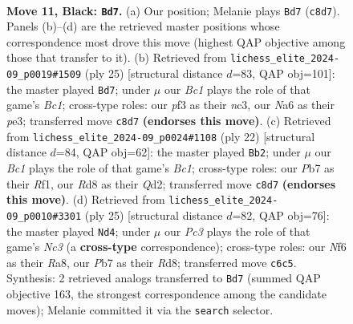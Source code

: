 \documentclass[11pt]{article}
\begin{document}
\begin{figure}[p]
\label{fig:thought-m19}
\end{figure}

\clearpage

\begin{figure}[p]\centering
\begin{subfigure}{0.46\textwidth}\centering
\resizebox{\linewidth}{!}{%
\newchessgame
\chessboard[
  setfen={r1br2k1/ppq1bppp/n1p1pn2/8/P1NP4/1P3PP1/4P1BP/RNBQ1RK1 b - - 0 11},
  showmover=false,
  pgfstyle=straightmove, color=movearrow, markmove={c8-d7}
]}
\caption{}
\end{subfigure}\hfill
\begin{subfigure}{0.46\textwidth}\centering
\resizebox{\linewidth}{!}{%
\newchessgame
\chessboard[
  setfen={r1br2k1/ppq1bppp/2p1pn2/8/2NP4/2N1P1P1/PP3PBP/2RQ1RK1 b - - 4 13},
  showmover=false,
  pgfstyle=straightmove, color=movearrow, markmove={c8-d7}
]}
\caption{}
\end{subfigure}
\\[4pt]
\begin{subfigure}{0.46\textwidth}\centering
\resizebox{\linewidth}{!}{%
\newchessgame
\chessboard[
  setfen={1rbq1rk1/1p2ppbp/p2p1np1/8/2P5/1PN3P1/P2QPPBP/R1B2RK1 w - - 1 12},
  showmover=false,
  pgfstyle=straightmove, color=movearrow, markmove={c1-b2}
]}
\caption{}
\end{subfigure}\hfill
\begin{subfigure}{0.46\textwidth}\centering
\resizebox{\linewidth}{!}{%
\newchessgame
\chessboard[
  setfen={r1br2k1/1pq1bppp/p1n1pn2/8/2P5/P1N2NP1/1P2QPBP/R1B1R1K1 b - - 8 13},
  showmover=false,
  pgfstyle=straightmove, color=movearrow, markmove={c6-d4}
]}
\caption{}
\end{subfigure}
\caption{\textbf{Move 11, Black: \texttt{Bd7}.} (a) Our position; Melanie plays \texttt{Bd7} (\texttt{c8d7}). Panels (b)--(d) are the retrieved master positions whose correspondence most drove this move (highest QAP objective among those that transfer to it). (b) Retrieved from \texttt{lichess\_elite\_2024-09\_p0019\#1509} (ply 25) [structural distance $d$=83, QAP obj=101]: the master played \texttt{Bd7}; under $\mu$ our \emph{Bc1} plays the role of that game's \emph{Bc1}; cross-type roles: our \emph{p}f3 as their \emph{n}c3, our \emph{N}a6 as their \emph{p}e3; transferred move \texttt{c8d7} \textbf{(endorses this move)}. (c) Retrieved from \texttt{lichess\_elite\_2024-09\_p0024\#1108} (ply 22) [structural distance $d$=84, QAP obj=62]: the master played \texttt{Bb2}; under $\mu$ our \emph{Bc1} plays the role of that game's \emph{Bc1}; cross-type roles: our \emph{P}b7 as their \emph{R}f1, our \emph{R}d8 as their \emph{Q}d2; transferred move \texttt{c8d7} \textbf{(endorses this move)}. (d) Retrieved from \texttt{lichess\_elite\_2024-09\_p0010\#3301} (ply 25) [structural distance $d$=82, QAP obj=76]: the master played \texttt{Nd4}; under $\mu$ our \emph{Pc3} plays the role of that game's \emph{Nc3} (a \textbf{cross-type} correspondence); cross-type roles: our \emph{N}f6 as their \emph{R}a8, our \emph{P}b7 as their \emph{R}d8; transferred move \texttt{c6c5}. Synthesis: 2 retrieved analogs transferred to \texttt{Bd7} (summed QAP objective 163, the strongest correspondence among the candidate moves); Melanie committed it via the \texttt{search} selector.}

\end{figure}
\end{document}
